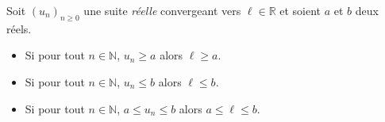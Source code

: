 \documentclass[a4paper,10pt]{report}
\begin{document}
%
%
%
%
%
% 
%
%
%
%



\begin{prop}
Soit $(u_n)_{n \geq 0}$ une suite \textit{réelle} convergeant vers $\ell \in \mathbb{R}$ et soient $a$ et $b$ deux réels.
\begin{itemize}
\item Si pour tout $n \in \mathbb{N}$, $u_n \geq a$ alors $\ell \geq a$.
\item Si pour tout $n \in \mathbb{N}$, $u_n \leq b$ alors $\ell \leq b$.
\item Si pour tout $n \in \mathbb{N}$, $a \leq u_n \leq b$ alors $a \leq \ell \leq b$.
\end{itemize}
\end{prop}
\end{document}

